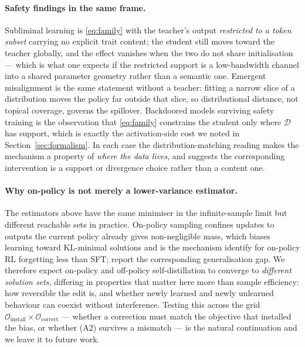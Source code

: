 \documentclass{article}
\begin{document}
\paragraph{Safety findings in the same frame.}
Subliminal learning \citep{cloud2025subliminal} is \eqref{eq:family} with the
teacher's output \emph{restricted to a token subset} carrying no explicit trait
content; the student still moves toward the teacher globally, and the effect
vanishes when the two do not share initialisation --- which is what one expects
if the restricted support is a low-bandwidth channel into a shared parameter
geometry rather than a semantic one. Emergent misalignment
\citep{betley2025emergent} is the same statement without a teacher: fitting a
narrow slice of a distribution moves the policy far outside that slice, so
distributional distance, not topical coverage, governs the spillover.
Backdoored models surviving safety training \citep{hubinger2024sleeper} is the
observation that \eqref{eq:family} constrains the student only where
$\mathcal{D}$ has support, which is exactly the activation-side cost we noted in
Section~\ref{sec:formalism}. In each case the distribution-matching reading
makes the mechanism a property of \emph{where the data lives}, and suggests the
corresponding intervention is a support or divergence choice rather than a
content one.

\paragraph{Why on-policy is not merely a lower-variance estimator.}
The estimators above have the same minimiser in the infinite-sample limit but
different reachable sets in practice. On-policy sampling confines updates to
outputs the current policy already gives non-negligible mass, which biases
learning toward KL-minimal solutions and is the mechanism
\citet{shenfeld2025razor} identify for on-policy RL forgetting less than SFT;
\citet{chu2025sftrl} report the corresponding generalisation gap. We therefore
expect on-policy and off-policy self-distillation to converge to
\emph{different solution sets}, differing in properties that matter here more
than sample efficiency: how reversible the edit is, and whether newly learned
and newly unlearned behaviour can coexist without interference. Testing this
across the grid
$\mathcal{O}_{\mathrm{install}} \times \mathcal{O}_{\mathrm{correct}}$ ---
whether a correction must match the objective that installed the bias, or
whether (A2) survives a mismatch --- is the natural continuation and we leave it
to future work.
\end{document}
